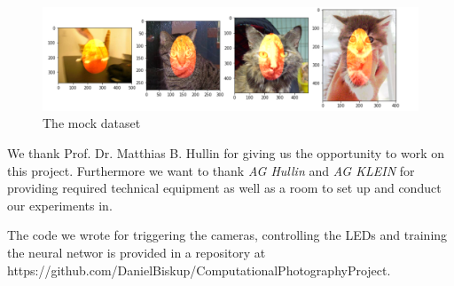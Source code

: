 \documentclass[sigconf]{acmart}
\begin{document}
\begin{figure}[h]
	\centering
	\includegraphics[width=\linewidth]{figures/kitties.png}
	\caption{The mock dataset}
	\label{fig:CatsAndOranges}
\end{figure} 


\begin{acks}
We thank Prof. Dr. Matthias B. Hullin for giving us the opportunity to work on this project. Furthermore we want to thank \emph{AG Hullin} and \emph{AG KLEIN} for providing required technical equipment as well as a room to set up and conduct our experiments in.

The code we wrote for triggering the cameras, controlling the LEDs and training the neural networ is provided in a repository at \\
https://github.com/DanielBiskup/ComputationalPhotographyProject.
\end{acks}

\nocite{*}


\end{document}

